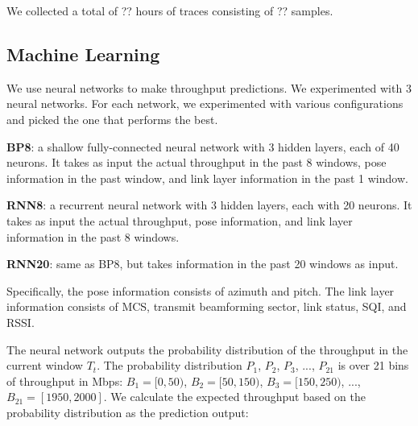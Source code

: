 \documentclass[sigconf,anonymous]{acmart}
\begin{document}
We collected a total of ?? hours of traces consisting of ?? samples.

\subsection{Machine Learning}
\label{subsection: Machine Learning}

We use neural networks to make throughput predictions. We experimented with 3 neural networks. For each network, we experimented with various configurations and picked the one that performs the best.

\textbf{BP8}: a shallow fully-connected neural network with 3 hidden layers, each of 40 neurons. It takes as input the actual throughput in the past 8 windows, pose information in the past window, and link layer information in the past 1 window.

\textbf{RNN8}: a recurrent neural network with 3 hidden layers, each with 20 neurons. It takes as input the actual throughput, pose information, and link layer information in the past 8 windows.

\textbf{RNN20}: same as BP8, but takes information in the past 20 windows as input.

Specifically, the pose information consists of azimuth and pitch. The link layer information consists of MCS, transmit beamforming sector, link status, SQI, and RSSI.


The neural network outputs the probability distribution of the throughput in the current window $T_{t}$. The probability distribution $P_{1}$, $P_{2}$, $P_{3}$, ..., $P_{21}$ is over 21 bins of throughput in Mbps: $B_{1}=[0,50)$, $B_{2}=[50, 150)$, $B_{3}=[150, 250)$, ..., $B_{21}=[1950, 2000]$. We calculate the expected throughput based on the probability distribution as the prediction output:
\end{document}
